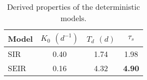 \begin{table}[h]
\centering
\caption{Derived properties of the deterministic models.}
\label{tab:props}
\begin{tabular}{lccc}
\toprule
Model & $K_0$ $(d^{-1})$ & $T_d$ $(d)$ & $\tau_s$  \\
 \midrule
 SIR &               0.40 &              1.74 &      1.98  \\
 SEIR &              0.16 &              4.32 &      \textbf{4.90}  \\
\bottomrule
\end{tabular}
\end{table}
